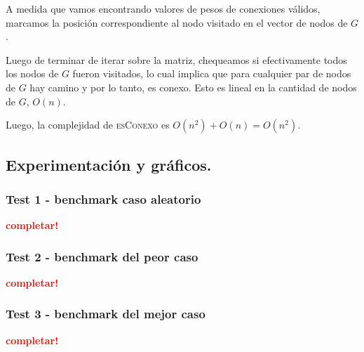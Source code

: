 \begin{enumerate}
  A medida que vamos encontrando valores de pesos de conexiones válidos, marcamos la posición
  correspondiente al nodo visitado en el vector de nodos de $G$.

  Luego de terminar de iterar sobre la matriz, chequeamos si efectivamente todos los nodos de $G$
  fueron visitados, lo cual implica que para cualquier par de nodos de $G$ hay camino y por lo
  tanto, es conexo. Esto es lineal en la cantidad de nodos de $G$, $O(n)$.

  Luego, la complejidad de \textsc{esConexo} es $O(n^2) + O(n) = O(n^2)$.

\end{enumerate}

\newpage
\subsection{Experimentación y gráficos.}

\vspace*{0.3cm}

\subsubsection{Test 1 - benchmark caso aleatorio}

\textcolor{red}{\textbf{completar!}}


\newpage
\subsubsection{Test 2 - benchmark del peor caso}

\textcolor{red}{\textbf{completar!}}


\newpage
\subsubsection{Test 3 - benchmark del mejor caso}

\textcolor{red}{\textbf{completar!}}
